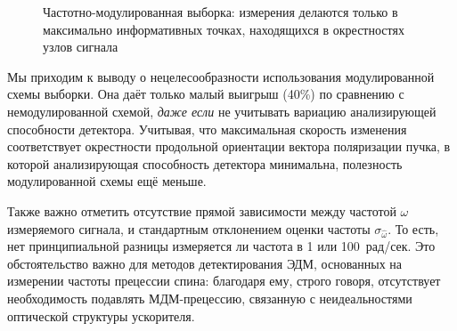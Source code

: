 \begin{figure}[H]\centering
	\begin{minipage}{.6\linewidth}
	
	\end{minipage}%
	\begin{minipage}{.4\linewidth}
	\caption{Частотно-модулированная выборка: измерения делаются только в максимально информативных точках,
		находящихся в окрестностях узлов сигнала\label{fig:modulated_sampling}}
	\end{minipage}
\end{figure}

Мы приходим к выводу о нецелесообразности использования модулированной схемы выборки. Она даёт только
малый выигрыш (40\%) по сравнению с немодулированной схемой, \emph{даже если} не учитывать вариацию 
анализирующей способности детектора. Учитывая, что максимальная скорость изменения соответствует
окрестности продольной ориентации вектора поляризации пучка, в которой анализирующая способность 
детектора минимальна, полезность модулированной схемы ещё меньше.

Также важно отметить отсутствие прямой зависимости между частотой $\omega$ измеряемого сигнала, 
и стандартным отклонением оценки частоты $\sigma_{\hat\omega}$. То есть, нет принципиальной разницы
измеряется ли частота в 1 или 100~рад/сек. Это обстоятельство важно для методов детектирования ЭДМ, 
основанных на измерении частоты прецессии спина: благодаря ему, строго говоря, 
отсутствует необходимость подавлять МДМ-прецессию, связанную с неидеальностями 
оптической структуры ускорителя.

